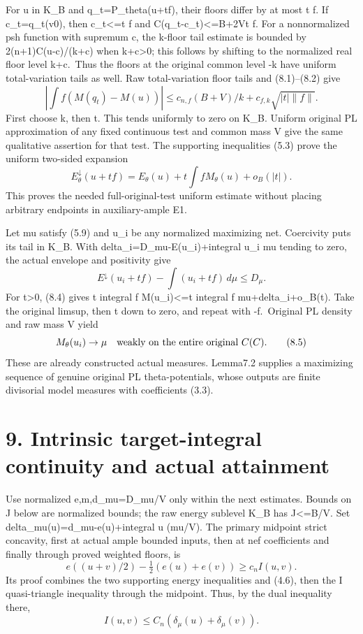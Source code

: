 \documentclass[
  10pt,
]{article}
\begin{document}
For u in K\_B and q\_t=P\_theta(u+tf), their floors differ by at most
\textbar t\textbar{} \textbar\textbar f\textbar\textbar. If
c\_t=q\_t(v0), then \textbar c\_t\textbar\textless=\textbar t\textbar{}
\textbar\textbar f\textbar\textbar{} and
C(q\_t-c\_t)\textless=B+2V\textbar t\textbar{}
\textbar\textbar f\textbar\textbar. For a nonnormalized psh function
with supremum c, the k-floor tail estimate is bounded by
2(n+1)C(u-c)/(k+c) when k+c\textgreater0; this follows by shifting to
the normalized real floor level k+c.~Thus the floors at the original
common level -k have uniform total-variation tails as well. Raw
total-variation floor tails and (8.1)--(8.2) give \[
 \left|\int f(M(q_t)-M(u))\right|
 \le c_{n,f}(B+V)/k+c_{f,k}\sqrt{|t|\|f\|}.                              \tag{8.3}
\] First choose k, then t. This tends uniformly to zero on K\_B. Uniform
original PL approximation of any fixed continuous test and common mass V
give the same qualitative assertion for that test. The supporting
inequalities (5.3) prove the uniform two-sided expansion \[
 E^\downarrow_\theta(u+tf)=E_\theta(u)+t\int fM_\theta(u)+o_B(|t|).        \tag{8.4}
\] This proves the needed full-original-test uniform estimate without
placing arbitrary endpoints in auxiliary-ample E1.

Let mu satisfy (5.9) and u\_i be any normalized maximizing net.
Coercivity puts its tail in K\_B. With delta\_i=D\_mu-E(u\_i)+integral
u\_i mu tending to zero, the actual envelope and positivity give \[
 E^\downarrow(u_i+tf)-\int(u_i+tf)\,d\mu\le D_\mu.
\] For t\textgreater0, (8.4) gives t integral f M(u\_i)\textless=t
integral f mu+delta\_i+o\_B(t). Take the original limsup, then t down to
zero, and repeat with -f.~Original PL density and raw mass V yield \[
 M_\theta(u_i)\to\mu\quad\hbox{weakly on the entire original }C(C).       \tag{8.5}
\] These are already constructed actual measures. Lemma7.2 supplies a
maximizing sequence of genuine original PL theta-potentials, whose
outputs are finite divisorial model measures with coefficients (3.3).

\section{9. Intrinsic target-integral continuity and actual
attainment}\label{intrinsic-target-integral-continuity-and-actual-attainment}

Use normalized e,m,d\_mu=D\_mu/V only within the next estimates. Bounds
on J below are normalized bounds; the raw energy sublevel K\_B has
J\textless=B/V. Set delta\_mu(u)=d\_mu-e(u)+integral u (mu/V). The
primary midpoint strict concavity, first at actual ample bounded inputs,
then at nef coefficients and finally through proved weighted floors, is
\[
 e((u+v)/2)-\tfrac12(e(u)+e(v))\ge c_n I(u,v).                           \tag{9.1}
\] Its proof combines the two supporting energy inequalities and (4.6),
then the I quasi-triangle inequality through the midpoint. Thus, by the
dual inequality there, \[
 I(u,v)\le C_n(\delta_\mu(u)+\delta_\mu(v)).                             \tag{9.2}
\]
\end{document}
